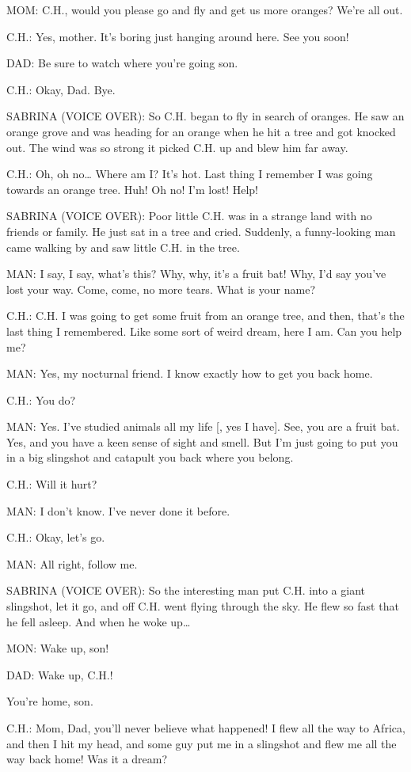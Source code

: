 MOM:
C.H., would you please go and fly and get us more oranges?
We're all out.

C.H.:
Yes, mother.
It's boring just hanging around here.
See you soon!

DAD:
Be sure to watch where you're going son.

C.H.:
Okay, Dad.
Bye.

SABRINA (VOICE OVER):
So C.H.
began to fly in search of oranges.
He saw an orange grove and was heading for an orange when he hit a tree and got knocked out.
The wind was so strong it picked C.H.
up and blew him far away.

C.H.:
Oh, oh no\dots
Where am I?
It's hot.
Last thing I remember I was going towards an orange tree.
Huh!
Oh no!
I'm lost!
Help!

SABRINA (VOICE OVER):
Poor little C.H.
was in a strange land with no friends or family.
He just sat in a tree and cried.
Suddenly, a funny-looking man came walking by and saw little C.H.
in the tree.

MAN:
I say, I say, what's this?
Why, why, it's a fruit bat!
Why, I'd say you've lost your way.
Come, come, no more tears.
What is your name?

C.H.:
C.H.
I was going to get some fruit from an orange tree, and then, that's the last thing I remembered.
Like some sort of weird dream, here I am.
Can you help me?

MAN:
Yes, my nocturnal friend.
I know exactly how to get you back home.

C.H.:
You do?

MAN:
Yes.
I've studied animals all my life [, yes I have].
See, you are a fruit bat.
Yes, and you have a keen sense of sight and smell.
But I'm just going to put you in a big slingshot and catapult you back where you belong.

C.H.:
Will it hurt?

MAN:
I don't know.
I've never done it before.

C.H.:
Okay, let's go.

MAN:
All right, follow me.

SABRINA (VOICE OVER):
So the interesting man put C.H.
into a giant slingshot, let it go, and off C.H.
went flying through the sky.
He flew so fast that he fell asleep.
And when he woke up\dots

MON:
Wake up, son!

DAD:
Wake up, C.H.!

You're home, son.

C.H.:
Mom, Dad, you'll never believe what happened!
I flew all the way to Africa, and then I hit my head, and some guy put me in a slingshot and flew me all the way back home!
Was it a dream?

